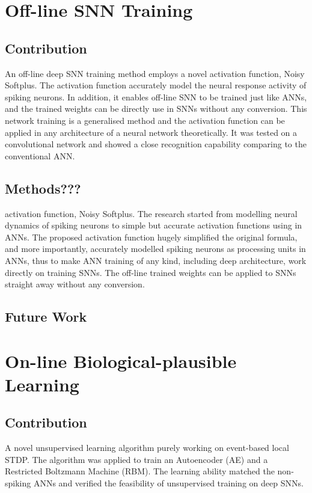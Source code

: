 \section{Off-line SNN Training}
\subsection{Contribution}
An off-line deep SNN training method employs a novel activation function, Noisy Softplus.
The activation function accurately model the neural response activity of spiking neurons.
In addition, it enables off-line SNN to be trained just like ANNs, and the trained weights can be directly use in SNNs without any conversion.
This network training is a generalised method and the activation function can be applied in any architecture of a neural network theoretically.
It was tested on a convolutional network and showed a close recognition capability comparing to the conventional ANN. 

\subsection{Methods???}
activation function, Noisy Softplus.
The research started from modelling neural dynamics of spiking neurons to simple but accurate activation functions using in ANNs.
The proposed activation function hugely simplified the original formula, and more importantly, accurately modelled spiking neurons as processing units in ANNs, thus to make ANN training of any kind, including deep architecture, work directly on training SNNs.
The off-line trained weights can be applied to SNNs straight away without any conversion.

\subsection{Future Work}

\section{On-line Biological-plausible Learning}
\subsection{Contribution}
A novel unsupervised learning algorithm purely working on event-based local STDP.
The algorithm was applied to train an Autoencoder (AE) and a Restricted Boltzmann Machine (RBM).
The learning ability matched the non-spiking ANNs and verified the feasibility of unsupervised training on deep SNNs. 

